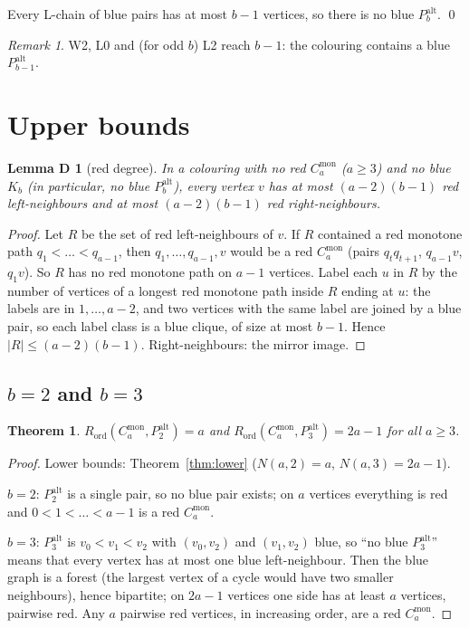 \documentclass[11pt]{article}
\newcommand{\Rord}{R_{\mathrm{ord}}}
\newcommand{\Cmon}[1]{C_{#1}^{\mathrm{mon}}}
\newcommand{\Palt}[1]{P_{#1}^{\mathrm{alt}}}
\theoremstyle{plain}
\newtheorem{theorem}{Theorem}
\newtheorem*{lemmaD}{Lemma D}
\theoremstyle{remark}
\newtheorem*{remark}{Remark}
\begin{document}
Every L-chain of blue pairs has at most $b-1$ vertices, so there is no blue $\Palt{b}$. \qed

\begin{remark}
W2, L0 and (for odd $b$) L2 reach $b-1$: the colouring contains a blue $\Palt{b-1}$.
\end{remark}

\section{Upper bounds}

\begin{lemmaD}[red degree]
In a colouring with no red $\Cmon{a}$ ($a \geq 3$) and no blue $K_b$ (in particular, no blue $\Palt{b}$), every
vertex $v$ has at most $(a-2)(b-1)$ red left-neighbours and at most $(a-2)(b-1)$ red right-neighbours.
\end{lemmaD}

\begin{proof}
Let $R$ be the set of red left-neighbours of $v$. If $R$ contained a red monotone path $q_1 < \dots < q_{a-1}$,
then $q_1, \dots, q_{a-1}, v$ would be a red $\Cmon{a}$ (pairs $q_t q_{t+1}$, $q_{a-1} v$, $q_1 v$). So $R$ has no
red monotone path on $a-1$ vertices. Label each $u$ in $R$ by the number of vertices of a longest red monotone
path inside $R$ ending at $u$: the labels are in $1, \dots, a-2$, and two vertices with the same label are joined
by a blue pair, so each label class is a blue clique, of size at most $b-1$. Hence $|R| \leq (a-2)(b-1)$.
Right-neighbours: the mirror image.
\end{proof}

\subsection{$b = 2$ and $b = 3$}

\begin{theorem}\label{thm:b23}
$\Rord(\Cmon{a}, \Palt{2}) = a$ and $\Rord(\Cmon{a}, \Palt{3}) = 2a-1$ for all $a \geq 3$.
\end{theorem}

\begin{proof}
Lower bounds: Theorem~\ref{thm:lower} ($N(a,2) = a$, $N(a,3) = 2a-1$).

$b = 2$: $\Palt{2}$ is a single pair, so no blue pair exists; on $a$ vertices everything is red and
$0 < 1 < \dots < a-1$ is a red $\Cmon{a}$.

$b = 3$: $\Palt{3}$ is $v_0 < v_1 < v_2$ with $(v_0, v_2)$ and $(v_1, v_2)$ blue, so ``no blue $\Palt{3}$'' means
that every vertex has at most one blue left-neighbour. Then the blue graph is a forest (the largest vertex of a
cycle would have two smaller neighbours), hence bipartite; on $2a-1$ vertices one side has at least $a$ vertices,
pairwise red. Any $a$ pairwise red vertices, in increasing order, are a red $\Cmon{a}$.
\end{proof}
\end{document}
